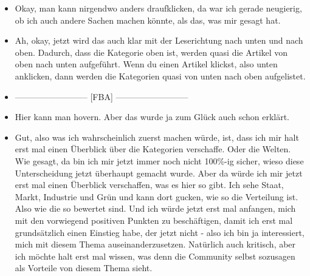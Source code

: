 {\begin{itemize}[]
                  Ich verstehe jetzt nicht sofort zu 100\% was gleich passieren wird, aber ich bin auch eher so der Typ, der sich eine Sache erst mal so oberflächlich durchliest, sage ich mal und dann einfach ausprobiert, was passiert.
                  Ich schätze mal, dass es da unterschiedliche Typen geben wird, also dass andere Leute da anders mit umgehen würden.
                  Aber ich bin jetzt nicht davor davon abgeschreckt, irgendwo drauf zu klicken, selbst wenn ich den Text jetzt nicht zu 100\% verstehe.
                  Aber wie gesagt, also zu 100\% verstehe ich jetzt nicht, was passieren wird.
                  Ich denke mir dann, dass ich das gleich einfach sehen werde.
            \item {} Okay, man kann nirgendwo anders draufklicken, da war ich gerade neugierig, ob ich auch andere Sachen machen könnte, als das, was mir gesagt hat.
            \item {} Ah, okay, jetzt wird das auch klar mit der Leserichtung nach unten und nach oben.
                  Dadurch, dass die Kategorie oben ist, werden quasi die Artikel von oben nach unten aufgeführt.
                  Wenn du einen Artikel klickst, also unten anklicken, dann werden die Kategorien quasi von unten nach oben aufgelistet.
            \item {--------------------------} [FBA] {--------------------------}
            \item {} Hier kann man hovern.
                  Aber das wurde ja zum Glück auch schon erklärt.
            \item {} Gut, also was ich wahrscheinlich zuerst machen würde, ist, dass ich mir halt erst mal einen Überblick über die Kategorien verschaffe.
                  Oder die Welten.
                  Wie gesagt, da bin ich mir jetzt immer noch nicht 100\%-ig sicher, wieso diese Unterscheidung jetzt überhaupt gemacht wurde.
                  Aber da würde ich mir jetzt erst mal einen Überblick verschaffen, was es hier so gibt.
                  Ich sehe Staat, Markt, Industrie und Grün und kann dort gucken, wie so die Verteilung ist.
                  Also wie die so bewertet sind.
                  Und ich würde jetzt erst mal anfangen, mich mit den vorwiegend positiven Punkten zu beschäftigen, damit ich erst mal grundsätzlich einen Einstieg habe, der jetzt nicht - also ich bin ja interessiert, mich mit diesem Thema auseinanderzusetzen.
                  Natürlich auch kritisch, aber ich möchte halt erst mal wissen, was denn die Community selbst sozusagen als Vorteile von diesem Thema sieht.

\end{itemize}}
